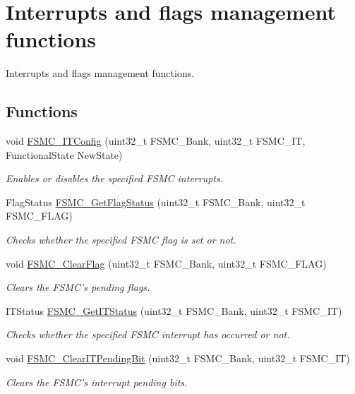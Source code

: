 \hypertarget{group___f_s_m_c___group4}{\section{Interrupts and flags management functions}
\label{group___f_s_m_c___group4}
}


Interrupts and flags management functions.  


\subsection*{Functions}
\begin{DoxyCompactItemize}
\item 
void \hyperlink{group___f_s_m_c___group4_ga217027ae3cd213b9076b6a1be197064c}{F\-S\-M\-C\-\_\-\-I\-T\-Config} (uint32\-\_\-t F\-S\-M\-C\-\_\-\-Bank, uint32\-\_\-t F\-S\-M\-C\-\_\-\-I\-T, Functional\-State New\-State)
\begin{DoxyCompactList}\small\item\em Enables or disables the specified F\-S\-M\-C interrupts. \end{DoxyCompactList}\item 
Flag\-Status \hyperlink{group___f_s_m_c___group4_gae00355115b078f483f0771057bb849c4}{F\-S\-M\-C\-\_\-\-Get\-Flag\-Status} (uint32\-\_\-t F\-S\-M\-C\-\_\-\-Bank, uint32\-\_\-t F\-S\-M\-C\-\_\-\-F\-L\-A\-G)
\begin{DoxyCompactList}\small\item\em Checks whether the specified F\-S\-M\-C flag is set or not. \end{DoxyCompactList}\item 
void \hyperlink{group___f_s_m_c___group4_ga697618f2de0ad9a8a82461ddbebd5264}{F\-S\-M\-C\-\_\-\-Clear\-Flag} (uint32\-\_\-t F\-S\-M\-C\-\_\-\-Bank, uint32\-\_\-t F\-S\-M\-C\-\_\-\-F\-L\-A\-G)
\begin{DoxyCompactList}\small\item\em Clears the F\-S\-M\-C's pending flags. \end{DoxyCompactList}\item 
I\-T\-Status \hyperlink{group___f_s_m_c___group4_ga7fce9ca889d33cd8b8b7413875dd4d73}{F\-S\-M\-C\-\_\-\-Get\-I\-T\-Status} (uint32\-\_\-t F\-S\-M\-C\-\_\-\-Bank, uint32\-\_\-t F\-S\-M\-C\-\_\-\-I\-T)
\begin{DoxyCompactList}\small\item\em Checks whether the specified F\-S\-M\-C interrupt has occurred or not. \end{DoxyCompactList}\item 
void \hyperlink{group___f_s_m_c___group4_gad9387e7674b8a376256a3378649e004e}{F\-S\-M\-C\-\_\-\-Clear\-I\-T\-Pending\-Bit} (uint32\-\_\-t F\-S\-M\-C\-\_\-\-Bank, uint32\-\_\-t F\-S\-M\-C\-\_\-\-I\-T)
\begin{DoxyCompactList}\small\item\em Clears the F\-S\-M\-C's interrupt pending bits. \end{DoxyCompactList}\end{DoxyCompactItemize}


